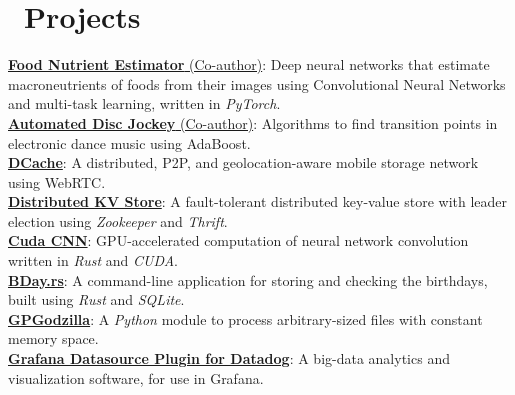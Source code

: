 \documentclass{resume}
\begin{document}
\section{\faCodeFork\ Projects}
 {

  \fontsize{10.5pt}{1.25}\selectfont
  \href{https://github.com/yirzhou/11785-Nutrient-Estimation}{\textbf{Food Nutrient Estimator} (Co-author)}: Deep neural networks that estimate macroneutrients of foods from their images using Convolutional Neural Networks and multi-task learning, written in \emph{PyTorch}. \\
  \href{https://github.com/pythonicmux/automated-dj-mlsp/tree/yirzhou}{\textbf{Automated Disc Jockey} (Co-author)}: Algorithms to find transition points in electronic dance music using AdaBoost. \\
  \href{https://drive.google.com/file/d/1Svd-wbXZiO84QmVKnKBp1cClJb2uvtWT/view?usp=sharing}{\textbf{DCache}}: A distributed, P2P, and geolocation-aware mobile storage network using WebRTC. \\
  \href{https://github.com/yirzhou/KVStore}{\textbf{Distributed KV Store}}: A fault-tolerant distributed key-value store with leader election using \emph{Zookeeper} and \emph{Thrift}. \\
  \href{https://github.com/yirzhou/CudaCNN}{\textbf{Cuda CNN}}: GPU-accelerated computation of neural network convolution written in \emph{Rust} and \emph{CUDA}. \\
  \href{https://github.com/yirzhou/IsolatedSoul/tree/main/rsbday}{\textbf{BDay.rs}}: A command-line application for storing and checking the birthdays, built using \emph{Rust} and \emph{SQLite}. \\
  \href{https://pypi.org/project/gpgodzilla/}{\textbf{GPGodzilla}}: A \emph{Python} module to process arbitrary-sized files with constant memory space. \\
  \href{https://github.com/Enflick/grafana-datasource-datadog/pull/7}{\textbf{Grafana Datasource Plugin for Datadog}}: A big-data analytics and visualization software, for use in Grafana. \\
  \par
 }
\end{document}
